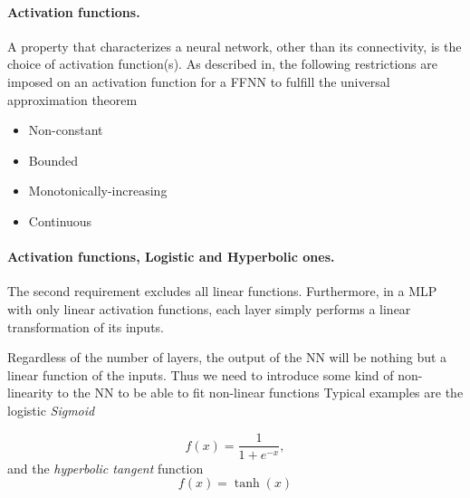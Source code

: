 \documentclass[%
oneside,                 %
final,                   %
10pt]{article}
\begin{document}
\paragraph{Activation functions.}
A property that characterizes a neural network, other than its
connectivity, is the choice of activation function(s).  As described
in, the following restrictions are imposed on an activation function
for a FFNN to fulfill the universal approximation theorem

\begin{itemize}
  \item Non-constant

  \item Bounded

  \item Monotonically-increasing

  \item Continuous
\end{itemize}

\noindent
\paragraph{Activation functions, Logistic and Hyperbolic ones.}
The second requirement excludes all linear functions. Furthermore, in
a MLP with only linear activation functions, each layer simply
performs a linear transformation of its inputs.

Regardless of the number of layers, the output of the NN will be
nothing but a linear function of the inputs. Thus we need to introduce
some kind of non-linearity to the NN to be able to fit non-linear
functions Typical examples are the logistic \emph{Sigmoid}

\[
 f(x) = \frac{1}{1 + e^{-x}},
\]
and the \emph{hyperbolic tangent} function
\[
 f(x) = \tanh(x)
\]

\end{document}
